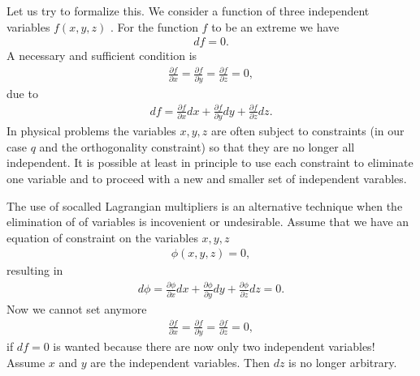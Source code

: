\documentclass[letterpaper,10pt,english]{sphinxmanual}
\begin{document}
Let us try to formalize this. We consider a function of three independent variables \(f(x,y,z)\) . For
the function \(f\) to be an extreme we have
\begin{equation*}
\begin{split}
df=0.
\end{split}
\end{equation*}
A necessary and sufficient condition is
\begin{equation*}
\begin{split}
\frac{\partial f}{\partial x} =\frac{\partial f}{\partial y}=\frac{\partial f}{\partial z}=0,
\end{split}
\end{equation*}
due to
\begin{equation*}
\begin{split}
df = \frac{\partial f}{\partial x}dx+\frac{\partial f}{\partial y}dy+\frac{\partial f}{\partial z}dz.
\end{split}
\end{equation*}
In physical problems the variables \(x,y,z\) are often subject to constraints (in our case \(q\) and the orthogonality constraint)
so that they are no longer all independent. It is possible at least in principle to use each constraint to eliminate one variable
and to proceed with a new and smaller set of independent varables.

The use of so\sphinxhyphen{}called Lagrangian  multipliers is an alternative technique  when the elimination of
of variables is incovenient or undesirable.  Assume that we have an equation of constraint on the variables \(x,y,z\)
\begin{equation*}
\begin{split}
\phi(x,y,z) = 0,
\end{split}
\end{equation*}
resulting in
\begin{equation*}
\begin{split}
d\phi = \frac{\partial \phi}{\partial x}dx+\frac{\partial \phi}{\partial y}dy+\frac{\partial \phi}{\partial z}dz =0.
\end{split}
\end{equation*}
Now we cannot set anymore
\begin{equation*}
\begin{split}
\frac{\partial f}{\partial x} =\frac{\partial f}{\partial y}=\frac{\partial f}{\partial z}=0,
\end{split}
\end{equation*}
if \(df=0\) is wanted
because there are now only two independent variables!  Assume \(x\) and \(y\) are the independent variables.
Then \(dz\) is no longer arbitrary.
\end{document}
